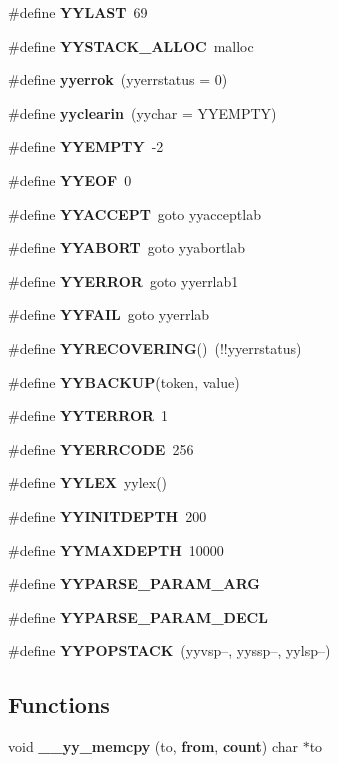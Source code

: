 \begin{CompactItemize}
\item 
\#define {\bf YYLAST}\ 69
\item 
\#define {\bf YYSTACK\_\-ALLOC}\ malloc
\item 
\#define {\bf yyerrok}\ (yyerrstatus = 0)
\item 
\#define {\bf yyclearin}\ (yychar = YYEMPTY)
\item 
\#define {\bf YYEMPTY}\ -2
\item 
\#define {\bf YYEOF}\ 0
\item 
\#define {\bf YYACCEPT}\ goto yyacceptlab
\item 
\#define {\bf YYABORT}\ goto yyabortlab
\item 
\#define {\bf YYERROR}\ goto yyerrlab1
\item 
\#define {\bf YYFAIL}\ goto yyerrlab
\item 
\#define {\bf YYRECOVERING}()\ (!!yyerrstatus)
\item 
\#define {\bf YYBACKUP}(token, value)
\item 
\#define {\bf YYTERROR}\ 1
\item 
\#define {\bf YYERRCODE}\ 256
\item 
\#define {\bf YYLEX}\ yylex()
\item 
\#define {\bf YYINITDEPTH}\ 200
\item 
\#define {\bf YYMAXDEPTH}\ 10000
\item 
\#define {\bf YYPARSE\_\-PARAM\_\-ARG}
\item 
\#define {\bf YYPARSE\_\-PARAM\_\-DECL}
\item 
\#define {\bf YYPOPSTACK}\ (yyvsp--, yyssp--, yylsp--)
\end{CompactItemize}
\subsection*{Functions}
\begin{CompactItemize}
\item 
void {\bf \_\-\_\-yy\_\-memcpy} (to, {\bf from}, {\bf count}) char $\ast$to
\end{CompactItemize}
